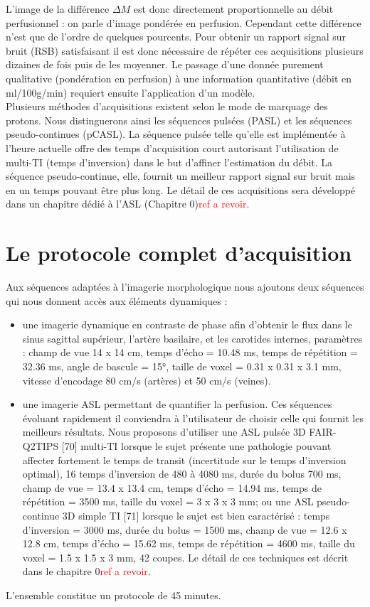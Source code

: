 L’image de la différence $\Delta M$ est donc directement proportionnelle au débit perfusionnel : on
parle d’image pondérée en perfusion. Cependant cette différence n’est que de l’ordre de quelques
pourcents. Pour obtenir un rapport signal sur bruit (RSB) satisfaisant il est donc nécessaire de répéter
ces acquisitions plusieurs dizaines de fois puis de les moyenner. Le passage d’une donnée purement
qualitative (pondération en perfusion) à une information quantitative (débit en ml/100g/min) requiert
ensuite l’application d’un modèle.\\
Plusieurs méthodes d’acquisitions existent selon le mode de marquage des protons. Nous
distinguerons ainsi les séquences pulsées (PASL) et les séquences pseudo-continues (pCASL). La
séquence pulsée telle qu’elle est implémentée à l’heure actuelle offre des temps d’acquisition court
autorisant l’utilisation de multi-TI (temps d’inversion) dans le but d’affiner l’estimation du débit. La
séquence pseudo-continue, elle, fournit un meilleur rapport signal sur bruit mais en un temps pouvant
être plus long. Le détail de ces acquisitions sera développé dans un chapitre dédié à l’ASL (Chapitre 0)\textcolor{red}{ref a revoir}.
\section{Le protocole complet d'acquisition}
Aux séquences adaptées à l’imagerie morphologique nous ajoutons deux séquences qui nous
donnent accès aux éléments dynamiques :
\begin{itemize}
\item une imagerie dynamique en contraste de phase afin d’obtenir le flux dans le sinus sagittal
supérieur, l’artère basilaire, et les carotides internes, paramètres : champ de vue 14 x 14
cm, temps d’écho = 10.48 ms, temps de répétition = 32.36 ms, angle de bascule = 15°,
taille de voxel = 0.31 x 0.31 x 3.1 mm, vitesse d’encodage 80 cm/s (artères) et 50 cm/s
(veines).
\item une imagerie ASL permettant de quantifier la perfusion. Ces séquences évoluant
rapidement il conviendra à l’utilisateur de choisir celle qui fournit les meilleurs résultats.
Nous proposons d’utiliser une ASL pulsée 3D FAIR-Q2TIPS [70] multi-TI lorsque le sujet
présente une pathologie pouvant affecter fortement le temps de transit (incertitude sur le
temps d’inversion optimal), 16 temps d’inversion de 480 à 4080 ms, durée du bolus 700
ms, champ de vue = 13.4 x 13.4 cm, temps d’écho = 14.94 ms, temps de répétition = 3500
ms, taille du voxel = 3 x 3 x 3 mm; ou une ASL pseudo-continue 3D simple TI [71] lorsque
le sujet est bien caractérisé : temps d’inversion = 3000 ms, durée du bolus = 1500 ms,
champ de vue = 12.6 x 12.8 cm, temps d’écho = 15.62 ms, temps de répétition = 4600 ms,
taille du voxel = 1.5 x 1.5 x 3 mm, 42 coupes. Le détail de ces techniques est décrit dans le
chapitre 0\textcolor{red}{ref a revoir}.
\end{itemize}
L’ensemble constitue un protocole de 45 minutes.




	
{}
